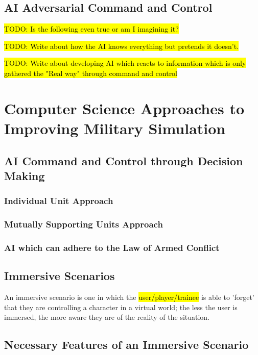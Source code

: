 \documentclass{article}
\begin{document}
\subsection{AI Adversarial Command and Control}

\hl{TODO: Is the following even true or am I imagining it?}

\hl{TODO: Write about how the AI knows everything but pretends it doesn't. }

\hl{TODO: Write about developing AI which reacts to information which is only gathered the "Real way" through command and control}

\section{Computer Science Approaches to Improving Military Simulation}

\subsection{AI Command and Control through Decision Making}

\subsubsection{Individual Unit Approach}

\subsubsection{Mutually Supporting Units Approach}

\subsubsection{AI which can adhere to the Law of Armed Conflict}

\subsection{Immersive Scenarios}

An immersive scenario is one in which the \hl{user/player/trainee} is able to 'forget' that they are controlling a character in a virtual world; the less the user is immersed, the more aware they are of the reality of the situation.

\subsection{Necessary Features of an Immersive Scenario}
\end{document}
